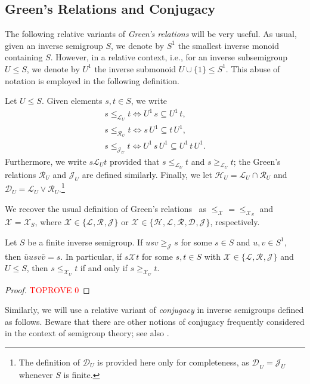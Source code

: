 \documentclass[anonymous,letter,UKenglish,cleveref,autoref,thm-restate]{lipics-v2021}
\renewcommand{\geq}{\geqslant}
\renewcommand{\leq}{\leqslant}
\newcommand*{\gH}[1][]{\mathrel{\mathcal{H}_{#1}}}
\newcommand*{\gL}[1][]{\mathrel{\mathcal{L}_{#1}}}
\newcommand*{\gR}[1][]{\mathrel{\mathcal{R}_{#1}}}
\newcommand*{\gD}[1][]{\mathrel{\mathcal{D}_{#1}}}
\newcommand*{\gJ}[1][]{\mathrel{\mathcal{J}_{#1}}}
\newcommand*{\gX}[1][]{\mathrel{\mathcal{X}_{#1}}}
\newcommand*{\gLle}[1][]{\leq_{\mathcal{L}_{#1}}}
\newcommand*{\gLge}[1][]{\geq_{\mathcal{L}_{#1}}}
\newcommand*{\gRle}[1][]{\leq_{\mathcal{R}_{#1}}}
\newcommand*{\gJle}[1][]{\leq_{\mathcal{J}_{#1}}}
\newcommand*{\gJge}[1][]{\geq_{\mathcal{J}_{#1}}}
\newcommand*{\gXle}[1][]{\leq_{\mathcal{X}_{#1}}}
\newcommand*{\gXge}[1][]{\geq_{\mathcal{X}_{#1}}}
\theoremstyle{plain}
\theoremstyle{plain}
\begin{document}
\subsection{Green's Relations and Conjugacy}\label{sec:Green-conjugacy}

The following relative variants of \emph{Green's relations} will be very useful.
As usual, given an inverse semigroup $S$, we denote by $S^1$ the smallest inverse monoid containing $S$.
However, in a relative context, i.e., for an inverse subsemigroup $U \leq S$, we denote by $U^1$ the inverse submonoid $U \cup \{1\} \leq S^1$.
This abuse of notation is employed in the following definition.

\begin{definition}
	Let $U \leq S$.
	Given elements $s,t \in S$, we write 
	\begin{gather*}
		s \gLle[U] t \iff U^1 \, s \subseteq U^1 \, t, \\
		s \gRle[U] t \iff s \, U^1 \subseteq t \, U^1, \\
		s \gJle[U] t \iff U^1 \, s \, U^1 \subseteq U^1 \, t \, U^1.
	\end{gather*}
	Furthermore, we write $s \gL[U] t$ provided that $s \gLle[U] t$ and $s \gLge[U] t$; the Green's relations $\gR[U]$ and $\gJ[U]$ are defined similarly.
  Finally, we let ${\gH[U]} = {\gL[U] \cap \gR[U]}$ and ${\gD[U]} = {\gL[U] \vee \gR[U]}$.\footnote{The definition of ${\gD[U]}$ is provided here only for completeness, as ${\gD_U} = {\gJ[U]}$ whenever $S$ is finite.}
\end{definition}

We recover the usual definition of Green's relations~\cite{gre51:short} as ${\gXle} = {\gXle[S]}$ and ${\gX} = {\gX[S]}$, where ${\gX} \in \{ {\gL}, {\gR}, {\gJ} \}$ or ${\gX} \in \{ {\gH}, {\gL}, {\gR}, {\gD}, {\gJ} \}$, respectively.

\begin{lemma}\label{lem:green-semi_rel}
  Let $S$ be a finite inverse semigroup. 
  If $u s v \gJge s$ for some $s \in S$ and $u,v \in S^1$, then $\bar u u s v \bar v = s$.
  In particular, if $s \gX t$ for some $s,t \in S$ with ${\gX} \in \{ {\gL}, {\gR}, {\gJ} \}$ and $U \leq S$, then $s \gXle[U] t$ if and only if $s \gXge[U] t$.
\end{lemma}
\begin{proof}\textcolor{red}{TOPROVE 0}\end{proof}

Similarly, we will use a relative variant of \emph{conjugacy} in inverse semigroups defined as follows.
Beware that there are other notions of conjugacy frequently considered in the context of semigroup theory; see also \cite{AraujoKinyonKnieczny19,Jack23}.
\end{document}
